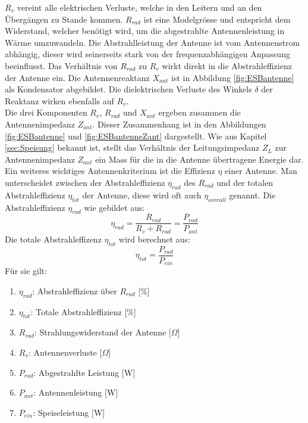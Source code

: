 \newpage
$R_{v}$ vereint alle elektrischen Verluste, welche in den Leitern und an den Übergängen zu Stande kommen. $R_{rad}$ ist eine Modelgrösse und entspricht dem Widerstand, welcher benötigt wird, um die abgestrahlte Antennenleistung in Wärme umzuwandeln. Die Abstrahlleistung der Antenne ist vom Antennenstrom abhängig, dieser wird seinerseits stark von der frequenzabhängigen Anpassung beeinflusst. Das Verhältnis von $R_{rad}$ zu $R_{v}$ wirkt direkt in die Abstrahleffizienz der Antenne ein. Die Antennenreaktanz $X_{ant}$ ist in Abbildung \ref{fig:ESBantenne} als Kondensator abgebildet. Die dielektrischen Verluste des Winkels $\delta$ der Reaktanz wirken ebenfalls auf $R_{v}$.\\
Die drei Komponenten $R_{v}$, $R_{rad}$ und $X_{ant}$ ergeben zusammen die Antennenimpedanz $Z_{ant}$. Dieser Zusammenhang ist in den Abbildungen \ref{fig:ESBantenne} und \ref{fig:ESBantenneZant} dargestellt. Wie aus Kapitel \ref{sec:Speisung} bekannt ist, stellt das Verhältnis der  Leitungsimpedanz $Z_L$ zur Antennenimpedanz $Z_{ant}$ ein Mass für die in die Antenne übertragene Energie dar. Ein weiteres wichtiges Antennenkriterium ist die Effizienz $\eta$ einer Antenne. Man unterscheidet zwischen der Abstrahleffizienz $\eta_{rad}$ des $R_{rad}$ und der totalen Abstrahleffizienz $\eta_{tot}$ der Antenne, diese wird oft auch $\eta_{overall}$ genannt. Die Abstrahleffizienz $\eta_{rad}$ wie gebildet aus:
\begin{equation}
\eta_{rad}=\dfrac{R_{rad}}{R_v + R_{rad}}=\dfrac{P_{rad}}{P_{ant}}
\label{eq:eta_rad}
\end{equation}
Die totale Abstrahleffizenz $\eta_{tot}$ wird berechnet aus:
\begin{equation}
\eta_{tot}=\dfrac{P_{rad}}{P_{ein}}
\label{eq:eta_tot}
\end{equation}
Für sie gilt:
\begin{enumerate}[leftmargin=2cm]
 \item[] $\eta_{rad}$: Abstrahleffizienz über $R_{rad}$ [$\%$] 
 \item[] $\eta_{tot}$: Totale Abstrahleffizienz [$\%$] 
 \item[] $R_{rad}$: Strahlungswiderstand der Antenne [$\Omega$] 
 \item[] $R_v$: Antennenverluste [$\Omega$] 
 \item[] $P_{rad}$: Abgestrahlte Leistung [W] 
 \item[] $P_{ant}$: Antennenleistung [W] 
 \item[] $P_{ein}$: Speiseleistung [W] 
\end{enumerate} 

